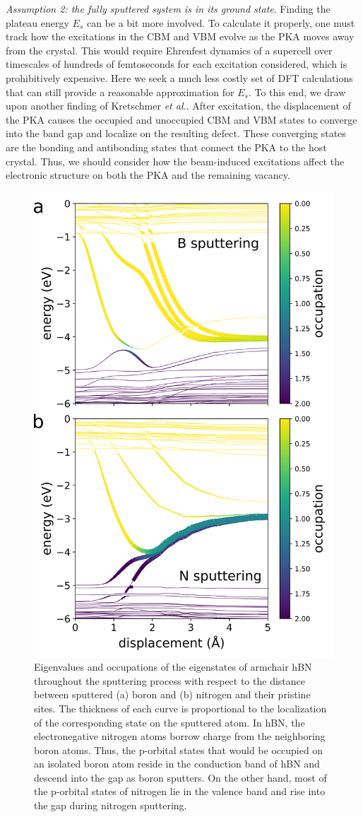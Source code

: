 \documentclass[twoside,twocolumn,9pt]{article}
\begin{document}
\medskip\noindent
\textit{Assumption 2: the fully sputtered system is in its ground state}.
Finding the plateau energy $E_s$ can be a bit more involved. To calculate it
properly, one must track how the excitations in the CBM and VBM evolve as the
PKA moves away from the crystal.
This would require Ehrenfest dynamics of a supercell over timescales of
hundreds of femtoseconds for each excitation considered, which is
prohibitively expensive.
Here we seek a much less costly set of DFT calculations that can still provide
a reasonable approximation for $E_s$.
To this end, we draw upon another finding of Kretschmer \textit{et al.}.
\cite{Kretschmer2020}
After excitation, the displacement of the PKA causes the occupied and
unoccupied CBM and VBM states to converge into the band gap and localize on the
resulting defect.
These converging states are the bonding and antibonding states that connect the
PKA to the host crystal.
Thus, we should consider how the beam-induced excitations affect the electronic
structure on both the PKA and the remaining vacancy.

\begin{figure}
  \centering
  \includegraphics[width=.45\textwidth]{figures/eigenvals_portrait.png}
  \caption{
    Eigenvalues and occupations of the eigenstates of armchair hBN throughout
    the sputtering process with respect to the distance between sputtered (a)
    boron and (b) nitrogen and their pristine sites.
    The thickness of each curve is proportional to the localization of the
    corresponding state on the sputtered atom.
    In hBN, the electronegative nitrogen atoms borrow charge from the
    neighboring boron atoms.
    Thus, the p-orbital states that would be occupied on an isolated boron atom
    reside in the conduction band of hBN and descend into the gap as boron
    sputters.
    On the other hand, most of the p-orbital states of nitrogen lie in the
    valence band and rise into the gap during nitrogen sputtering.
  }
  \label{fig:eigenvals}
\end{figure}
\end{document}
